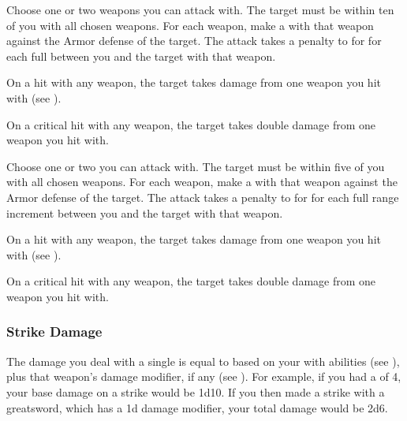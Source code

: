         \begin{freeability}{}
            Choose one or two  weapons you can attack with.
            The target must be within ten  of you with all chosen weapons.
            For each weapon, make a  with that weapon against the Armor defense of the target.
            The attack takes a  penalty to  for for each full  between you and the target with that weapon.

            On a hit with any weapon, the target takes damage from one weapon you hit with (see ).

            On a critical hit with any weapon, the target takes double damage from one weapon you hit with.
        \end{freeability}

        \begin{freeability}{}
            Choose one or two  you can attack with.
            The target must be within five  of you with all chosen weapons.
            For each weapon, make a  with that weapon against the Armor defense of the target.
            The attack takes a  penalty to  for for each full range increment between you and the target with that weapon.

            On a hit with any weapon, the target takes damage from one weapon you hit with (see ).

            On a critical hit with any weapon, the target takes double damage from one weapon you hit with.
        \end{freeability}

        \subsubsection{Strike Damage}\label{Strike Damage}
            The damage you deal with a single  is equal to  based on your  with  abilities (see ), plus that weapon's damage modifier, if any (see ).
            For example, if you had a  of 4, your base damage on a strike would be 1d10.
            If you then made a strike with a greatsword, which has a \plus1d damage modifier, your total damage would be 2d6.

